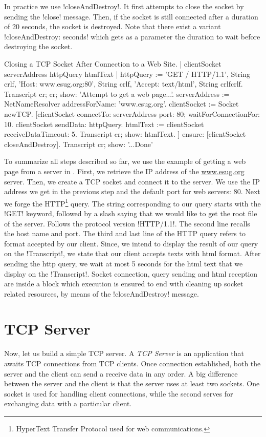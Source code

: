 \documentclass[a4paper,10pt,twoside]{book}
\begin{document}
In practice we use \ct!closeAndDestroy!. It first attempts to close the socket by sending the \ct!close! message.
Then, if the socket is still connected after a duration of 20 seconds, the socket is destroyed.
Note that there exist a variant \ct!closeAndDestroy: seconds! which gets as a parameter the duration to wait before destroying the socket.

\begin{script}{Closing a TCP Socket After Connection to a Web Site.}
| clientSocket serverAddress httpQuery htmlText |
httpQuery := 'GET / HTTP/1.1', String crlf, 
	'Host: www.esug.org:80', String crlf, 
	'Accept: text/html', String crlfcrlf.
Transcript cr; cr; show: 'Attempt to get a web page...'.
serverAddress := NetNameResolver addressForName: 'www.esug.org'.
clientSocket := Socket newTCP.
[clientSocket 
	connectTo: serverAddress port: 80;
	waitForConnectionFor: 10.
 clientSocket sendData: httpQuery.
 htmlText  := clientSocket receiveDataTimeout: 5.
 Transcript cr; show: htmlText.
] ensure: [clientSocket closeAndDestroy].
Transcript cr; show: '...Done'
\end{script}

To summarize all steps described so far, we use the example of getting a web page from a server in .
First, we retrieve the IP address of the \url{www.esug.org} server.
Then, we create a TCP socket and connect it to the server.
We use the IP address we get in the previous step and the default port for web servers: 80.
Next we forge the HTTP\footnote{HyperText Transfer Protocol used for web communications.} query.
The string corresponding  to our query starts with the \ct!GET! keyword, followed by a slash saying that we would like to get the root file of the server.
Follows the protocol version \ct!HTTP/1.1!.
The second line recalls the host name and port.
The third and last line of the HTTP query refers to format accepted by our client. 
Since, we intend to display the result of our query on the \ct!Transcript!, we state that our client accepts texts with html format.
After sending the http query, we wait at most 5 seconds for the html text that we display on the \ct!Transcript!.
Socket connection, query sending and html reception are inside a block which execution is ensured to end with cleaning up socket related resources, by means of the \ct!closeAndDestroy! message.

\section{TCP Server}
\label{sec:serverTcpSocket}
Now, let us build a simple TCP server. A \textit{TCP Server} is an application that awaits TCP connections from TCP clients. Once connection established, both the server and the client can send a receive data in any order. 
A big difference between the server and the client is that the server uses at least two sockets.
One socket is used for handling client connections, while the second serves for exchanging data with a particular client.
\end{document}
